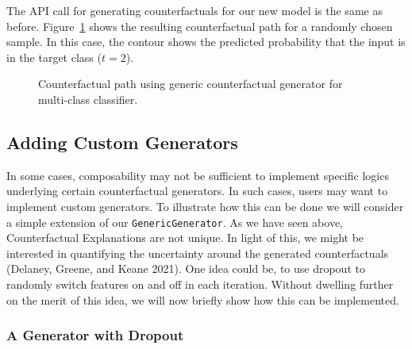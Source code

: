 \documentclass{juliacon}
\begin{document}
The API call for generating counterfactuals for our new model is the
same as before. Figure~\ref{fig-multi} shows the resulting
counterfactual path for a randomly chosen sample. In this case, the
contour shows the predicted probability that the input is in the target
class (\(t=2\)).

\begin{figure}


\caption{\label{fig-multi}Counterfactual path using generic
counterfactual generator for multi-class classifier.}

\end{figure}%

\subsection{Adding Custom Generators}\label{sec-custom-gen}

In some cases, composability may not be sufficient to implement specific
logics underlying certain counterfactual generators. In such cases,
users may want to implement custom generators. To illustrate how this
can be done we will consider a simple extension of our
\texttt{GenericGenerator}. As we have seen above, Counterfactual
Explanations are not unique. In light of this, we might be interested in
quantifying the uncertainty around the generated counterfactuals
(Delaney, Greene, and Keane 2021). One idea could be, to use dropout to
randomly switch features on and off in each iteration. Without dwelling
further on the merit of this idea, we will now briefly show how this can
be implemented.

\subsubsection{A Generator with Dropout}\label{a-generator-with-dropout}
\end{document}
